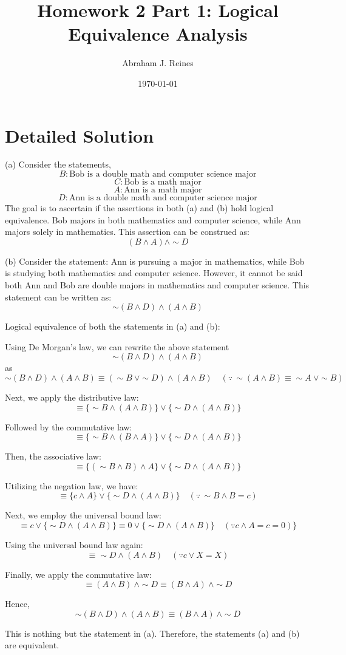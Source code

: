 \documentclass{article}
\begin{document}
\title{Homework 2 Part 1: Logical Equivalence Analysis}
\author{Abraham J. Reines}
\date{\today}
\maketitle


\section*{Detailed Solution}

(a)
Consider the statements,
\[ B: \text{Bob is a double math and computer science major} \]
\[ C: \text{Bob is a math major} \]
\[ A: \text{Ann is a math major} \]
\[ D: \text{Ann is a double math and computer science major} \]
The goal is to ascertain if the assertions in both (a) and (b) hold logical equivalence.
Bob majors in both mathematics and computer science, while Ann majors solely in mathematics.
This assertion can be construed as:
\[ (B \land A) \land \sim D \]

(b) Consider the statement: Ann is pursuing a major in mathematics, while Bob is studying both mathematics and computer science. However, it cannot be said both Ann and Bob are double majors in mathematics and computer science. This statement can be written as:
\[ \sim (B \land D) \land (A \land B) \]

Logical equivalence of both the statements in (a) and (b):

Using De Morgan’s law, we can rewrite the above statement 
\[
\sim (B \land D) \land (A \land B) 
\]
as
\[
\sim (B \land D) \land (A \land B) \equiv (\sim B \ \lor \sim D) \land (A \land B) \quad (\because \, \sim (A \land B) \equiv \sim A \ \lor \sim B)
\] 

Next, we apply the distributive law: 
\[
\equiv \{ \sim B \land (A \land B) \} \lor \{ \sim D \land (A \land B) \}
\]

Followed by the commutative law: 
\[
\equiv \{ \sim B \land (B \land A) \} \lor \{ \sim D \land (A \land B) \}
\]

Then, the associative law: 
\[
\equiv \{ (\sim B \land B) \land A \} \lor \{ \sim D \land (A \land B) \}
\]

Utilizing the negation law, we have: 
\[
\equiv \{ c \land A \} \lor \{ \sim D \land (A \land B) \} \quad (\because \, \sim B \land B = c)
\]

Next, we employ the universal bound law: 
\[
\equiv c \lor \{ \sim D \land (A \land B)\} \equiv 0 \lor \{ \sim D \land (A \land B)\} \quad (\because {c \land A} = c = 0)\}
\]

Using the universal bound law again: 
\[
\equiv \sim D \land (A \land B) \quad (\because c \lor X = X)
\]

Finally, we apply the commutative law: 
\[
\equiv (A \land B) \ \land \sim D \equiv (B \land A) \ \land \sim D
\]

Hence, 
\[
\sim (B \land D) \land (A \land B) \equiv (B \land A) \ \land \sim D
\]

This is nothing but the statement in (a).
Therefore, the statements (a) and (b) are equivalent.
\end{document}
